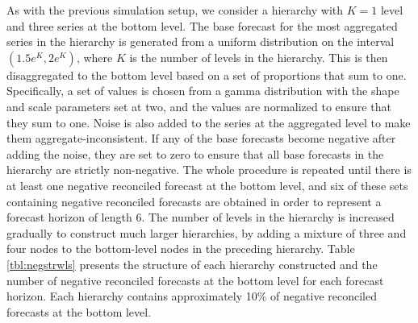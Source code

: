 \documentclass[11pt]{article}
\newcommand{\0}{\phantom{0}}
\begin{document}
As with the previous simulation setup, we consider a hierarchy with $K=1$ level and three series at the bottom level. The base forecast for the most aggregated series in the hierarchy is generated from a uniform distribution on the interval $(1.5e^{K}, 2e^{K})$, where $K$ is the number of levels in the hierarchy. This is then disaggregated to the bottom level based on a set of proportions that sum to one. Specifically, a set of values is chosen from a gamma distribution with the shape and scale parameters set at two, and the values are normalized to ensure that they sum to one. Noise is also added to the series at the aggregated level to make them aggregate-inconsistent. If any of the base forecasts become negative after adding the noise, they are set to zero to ensure that all base forecasts in the hierarchy are strictly non-negative. The whole procedure is repeated until there is at least one negative reconciled forecast at the bottom level, and six of these sets containing negative reconciled forecasts are obtained in order to represent a forecast horizon of length 6. The number of levels in the hierarchy is increased gradually to construct much larger hierarchies, by adding a mixture of three and four nodes to the bottom-level nodes in the preceding hierarchy. Table \ref{tbl:negstrwls} presents the structure of each hierarchy constructed and the number of negative reconciled forecasts at the bottom level for each forecast horizon. Each hierarchy contains approximately 10\% of negative reconciled forecasts at the bottom level. 
\end{document}
